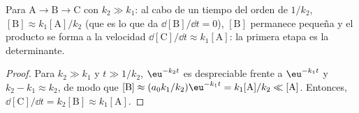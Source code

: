 \begin{proposition}\label{prop:b1:elementary-steps:qssa-justified}
Para $\mathrm{A} \to \mathrm{B} \to \mathrm{C}$ con $k_2 \gg k_1$: al cabo
de un tiempo del orden de $1/k_2$, $[\mathrm{B}] \approx k_1[\mathrm{A}]/k_2$
(que es lo que da $\dd[\mathrm{B}]/\dd t = 0$), $[\mathrm{B}]$ permanece
pequeña y el producto se forma a la velocidad
$\dd[\mathrm{C}]/\dd t \approx k_1[\mathrm{A}]$: la primera etapa es la
determinante.
\end{proposition}

\begin{proof}
Para $k_2 \gg k_1$ y $t \gg 1/k_2$, $\eu^{-k_2t}$ es despreciable frente a
$\eu^{-k_1t}$ y $k_2 - k_1 \approx k_2$, de modo que $[\mathrm{B}] \approx (a_0k_1/k_2)
\eu^{-k_1t} = k_1[\mathrm{A}]/k_2 \ll [\mathrm{A}]$. Entonces,
$\dd[\mathrm{C}]/\dd t = k_2[\mathrm{B}] \approx k_1[\mathrm{A}]$.
\end{proof}

